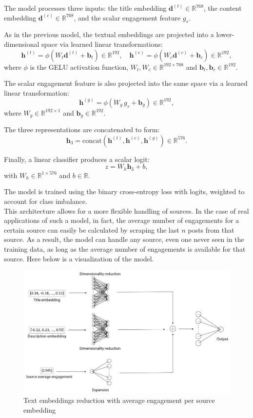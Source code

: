 \documentclass[a4paper,twoside,12pt]{book}
\begin{document}
The model processes three inputs: the title embedding $\mathbf{d}^{(t)} \in \mathbb{R}^{768}$, the content embedding $\mathbf{d}^{(c)} \in \mathbb{R}^{768}$, and the scalar engagement feature $g_s$.

As in the previous model, the textual embeddings are projected into a lower-dimensional space via learned linear transformations:
\[
\mathbf{h}^{(t)} = \phi\left(W_t \mathbf{d}^{(t)} + \mathbf{b}_t \right) \in \mathbb{R}^{192}, \quad
\mathbf{h}^{(c)} = \phi\left(W_c \mathbf{d}^{(c)} + \mathbf{b}_c \right) \in \mathbb{R}^{192},
\]
where $\phi$ is the GELU activation function,  $W_t, W_c \in \mathbb{R}^{192\times 768}$ and $\mathbf{b}_t, \mathbf{b}_c \in \mathbb{R}^{192}$.

The scalar engagement feature is also projected into the same space via a learned linear transformation:
\[
\mathbf{h}^{(g)} = \phi\left(W_g \, g_s + \mathbf{b}_g \right) \in \mathbb{R}^{192},
\]
where $W_g \in \mathbb{R}^{192 \times 1}$ and $\mathbf{b}_g \in \mathbb{R}^{192}$.

The three representations are concatenated to form:
\[
\mathbf{h}_3 = \text{concat}(\mathbf{h}^{(t)}, \mathbf{h}^{(c)}, \mathbf{h}^{(g)}) \in \mathbb{R}^{576}.
\]

Finally, a linear classifier produces a scalar logit:
\[
z = W_h \mathbf{h}_3 + b,
\]
with $W_h\in \mathbb{R}^{1 \times 576}$ and $b \in \mathbb{R}$.

The model is trained using the binary cross-entropy loss with logits, weighted to account for class imbalance. \\

This architecture allows for a more flexible handling of sources. In the case of real applications of such a model, in fact, the average number of engagements for a certain source can easily be calculated by scraping the last $n$ posts from that source. As a result, the model can handle any source, even one never seen in the training data, as long as the average number of engagements is available for that source. 
Here below is a visualization of the model. 

\begin{figure}[h!]
	\centering
	\includegraphics[width=1.1\textwidth]{./img/3_mlp_architecture.png}
	\caption{Text embeddings reduction with average engagement per source embedding}
\end{figure}
\end{document}
